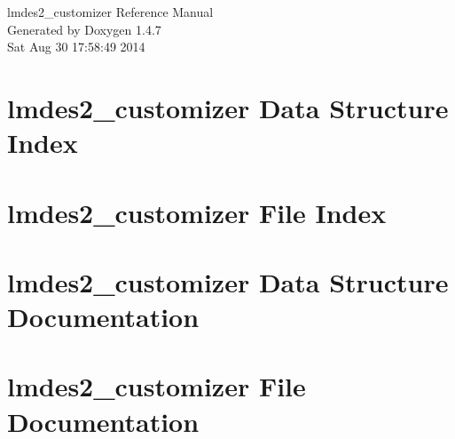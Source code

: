 \documentclass[letterpaper]{book}
\begin{document}
\begin{titlepage}
\vspace*{7cm}
\begin{center}
{\Large lmdes2\_\-customizer Reference Manual}\\
\vspace*{1cm}
{\large Generated by Doxygen 1.4.7}\\
\vspace*{0.5cm}
{\small Sat Aug 30 17:58:49 2014}\\
\end{center}
\end{titlepage}
\clearemptydoublepage
{}
\tableofcontents
\clearemptydoublepage
{}
\chapter{lmdes2\_\-customizer Data Structure Index}

\chapter{lmdes2\_\-customizer File Index}

\chapter{lmdes2\_\-customizer Data Structure Documentation}






\chapter{lmdes2\_\-customizer File Documentation}


\printindex
\end{document}
